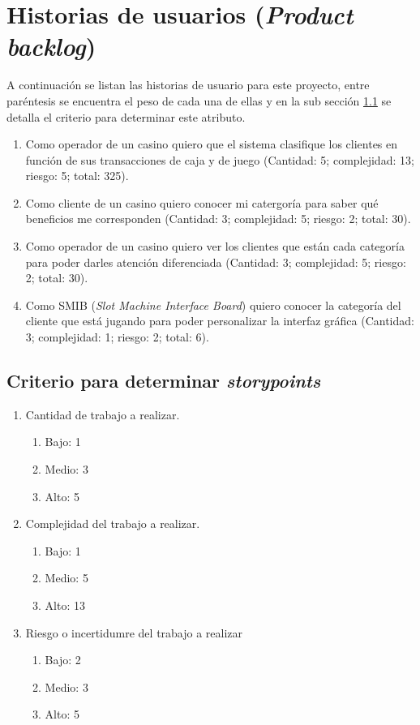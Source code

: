 \documentclass[11pt]{charter}
\begin{document}
\section{Historias de usuarios (\textit{Product backlog})}
\label{sec:backlog}
A continuación se listan las historias de usuario para este proyecto, entre paréntesis se encuentra el peso
de cada una de ellas y en la sub sección \ref{storypoints_criteria} se detalla el criterio para determinar 
este atributo.

\begin{enumerate}
  \item Como operador de un casino quiero que el sistema clasifique los clientes en función de sus transacciones
  de caja y de juego (Cantidad: 5; complejidad: 13; riesgo: 5; total: 325).
  \item Como cliente de un casino quiero conocer mi catergoría para saber qué beneficios me corresponden (Cantidad: 3; 
  complejidad: 5; riesgo: 2; total: 30).
  \item Como operador de un casino quiero ver los clientes que están cada categoría para poder darles 
  atención diferenciada (Cantidad: 3; complejidad: 5; riesgo: 2; total: 30).
  \item Como SMIB (\textit{Slot Machine Interface Board}) quiero conocer la categoría del cliente que está jugando 
  para poder personalizar la interfaz gráfica (Cantidad: 3; complejidad: 1; riesgo: 2; total: 6).
\end{enumerate}

\subsection{Criterio para determinar \textit{storypoints}}
\label{storypoints_criteria}
\begin{enumerate}
  \item Cantidad de trabajo a realizar.
  \begin{enumerate}
    \item Bajo: 1
    \item Medio: 3
    \item Alto: 5
  \end{enumerate}
  \item Complejidad del trabajo a realizar.
  \begin{enumerate}
    \item Bajo: 1
    \item Medio: 5
    \item Alto: 13
  \end{enumerate}
  \item Riesgo o incertidumre del trabajo a realizar
  \begin{enumerate}
    \item Bajo: 2
    \item Medio: 3
    \item Alto: 5
  \end{enumerate}
\end{enumerate}
\end{document}
